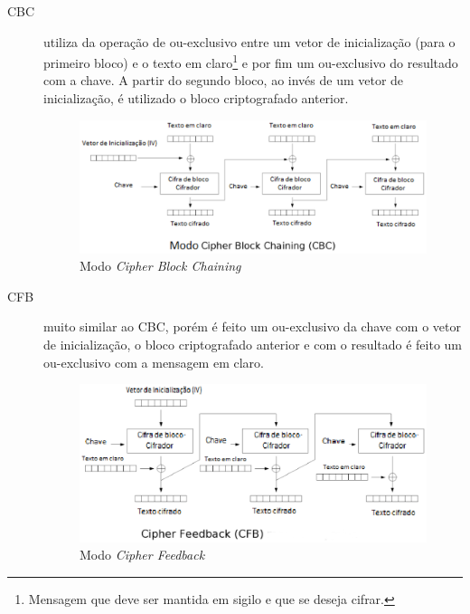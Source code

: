 \begin{description}
\begin{figure}[h]
\end{figure} 
\item[CBC] utiliza da operação de ou-exclusivo entre um vetor de inicialização (para o primeiro bloco) e o texto em claro\footnote{Mensagem que deve ser mantida em sigilo e que se deseja cifrar.} e por fim um ou-exclusivo do resultado com a chave. A partir do segundo bloco, ao invés de um vetor de inicialização, é utilizado o bloco criptografado anterior.
\begin{figure}[h]
\centering
\includegraphics[keepaspectratio=true,scale=0.9]
    {figuras/cbc.eps}
    \caption[Modo Cipher Block Chaining]{Modo \textit{Cipher Block Chaining}\protect\footnotemark}
\end{figure} 
\item[CFB] muito similar ao CBC, porém é feito um ou-exclusivo da chave com o vetor de inicialização, o bloco criptografado anterior e com o resultado é feito um ou-exclusivo com a mensagem em claro.
\begin{figure}[h]
\centering
\includegraphics[keepaspectratio=true,scale=0.9]
    {figuras/cfb.eps}
    \caption[Modo Cipher Feedback]{Modo \textit{Cipher Feedback} \protect\footnotemark} 
\end{figure}

\end{description}
